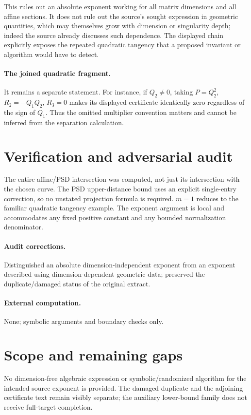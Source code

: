 \documentclass[11pt]{article}
\begin{document}
This rules out an absolute exponent working for all matrix dimensions and all affine sections. It does not rule out the source's sought expression in geometric quantities, which may themselves grow with dimension or singularity depth; indeed the source already discusses such dependence. The displayed chain explicitly exposes the repeated quadratic tangency that a proposed invariant or algorithm would have to detect.

\paragraph{The joined quadratic fragment.}
It remains a separate statement. For instance, if $Q_2\ne0$, taking $P=Q_2^2$, $R_2=-Q_1Q_2$, $R_3=0$ makes its displayed certificate identically zero regardless of the sign of $Q_1$. Thus the omitted multiplier convention matters and cannot be inferred from the separation calculation.
\section{Verification and adversarial audit}
The entire affine/PSD intersection was computed, not just its intersection with the chosen curve. The PSD upper-distance bound uses an explicit single-entry correction, so no unstated projection formula is required. $m=1$ reduces to the familiar quadratic tangency example. The exponent argument is local and accommodates any fixed positive constant and any bounded normalization denominator.
\paragraph{Audit corrections.} Distinguished an absolute dimension-independent exponent from an exponent described using dimension-dependent geometric data; preserved the duplicate/damaged status of the original extract.
\paragraph{External computation.} None; symbolic arguments and boundary checks only.
\section{Scope and remaining gaps}
No dimension-free algebraic expression or symbolic/randomized algorithm for the intended source exponent is provided. The damaged duplicate and the adjoining certificate text remain visibly separate; the auxiliary lower-bound family does not receive full-target completion.
\end{document}
